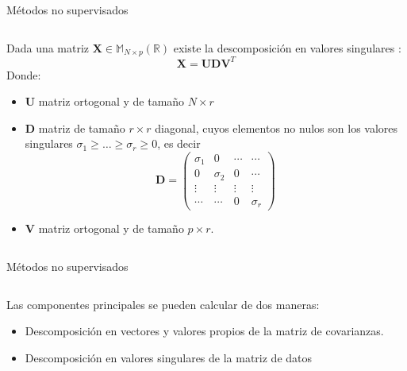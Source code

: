 \begin{frame}{Métodos no supervisados}
\begin{columns}
\begin{column}{0.9\textwidth}
\begin{defi}
Dada una matriz $\textbf{X}\in  \mathbb{M}_{N\times p}(\mathbb{R})$ existe la descomposición en valores singulares :
\begin{equation}
\textbf{X}=\textbf{U}\mathbf{D}\textbf{V}^T
\end{equation}
Donde: 
\begin{itemize}
\item \textbf{U} matriz ortogonal y de tamaño $N \times r$
\item $\mathbf{D}$ matriz de tamaño $r \times r$ diagonal, cuyos elementos no nulos son los valores singulares $\sigma_1\geq\ldots\geq \sigma_r\geq 0$, es decir
\begin{equation}
\mathbf{D}=\begin{pmatrix}
\sigma_1 & 0 & \cdots  & \cdots \\
0 & \sigma_2 & 0 & \cdots\\
\vdots & \vdots & \vdots & \vdots\\
\cdots & \cdots & 0 & \sigma_r
\end{pmatrix}
\end{equation}
\item \textbf{V} matriz ortogonal y de tamaño $p \times r$. 
\end{itemize}
\end{defi}
\end{column}
\end{columns}
\end{frame}

\begin{frame}{Métodos no supervisados}
\begin{columns}
\begin{column}{0.9\textwidth}

Las componentes principales se pueden calcular de dos maneras:
\begin{itemize}
\item Descomposición en vectores y valores propios de la matriz de covarianzas. 
\item Descomposición en valores singulares de la matriz de datos

\end{itemize}
\end{column}
\end{columns}
\end{frame}




